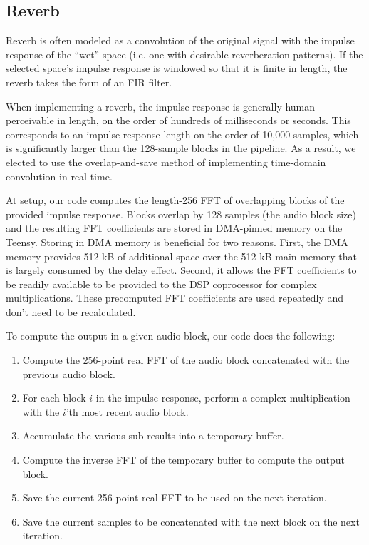 \documentclass[conference]{IEEEtran}
\begin{document}
\subsection{Reverb}

Reverb is often modeled as a convolution of the original signal with the impulse response of the ``wet'' space (i.e. one with desirable reverberation patterns). If the selected space's impulse response is windowed so that it is finite in length, the reverb takes the form of an FIR filter.

When implementing a reverb, the impulse response is generally human-perceivable in length, on the order of hundreds of milliseconds or seconds. This corresponds to an impulse response length on the order of 10,000 samples, which is significantly larger than the 128-sample blocks in the pipeline. As a result, we elected to use the overlap-and-save method of implementing time-domain convolution in real-time. 

At setup, our code computes the length-256 FFT of overlapping blocks of the provided impulse response. Blocks overlap by 128 samples (the audio block size) and the resulting FFT coefficients are stored in DMA-pinned memory on the Teensy. Storing in DMA memory is beneficial for two reasons. First, the DMA memory provides 512 kB of additional space over the 512 kB main memory that is largely consumed by the delay effect. Second, it allows the FFT coefficients to be readily available to be provided to the DSP coprocessor for complex multiplications. These precomputed FFT coefficients are used repeatedly and don't need to be recalculated.

To compute the output in a given audio block, our code does the following:
\begin{enumerate}
    \item Compute the 256-point real FFT of the audio block concatenated with the previous audio block.
    \item For each block $i$ in the impulse response, perform a complex multiplication with the $i$'th most recent audio block.
    \item Accumulate the various sub-results into a temporary buffer.
    \item Compute the inverse FFT of the temporary buffer to compute the output block.    
    \item Save the current 256-point real FFT to be used on the next iteration.
    \item Save the current samples to be concatenated with the next block on the next iteration.
\end{enumerate}
\end{document}
